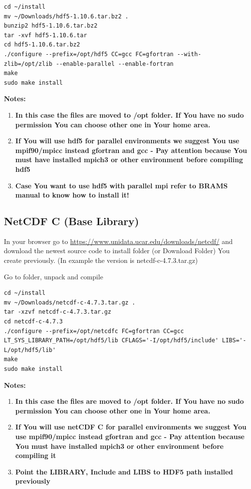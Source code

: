\documentclass{article}
\begin{document}
\begin{verbatim}
cd ~/install
mv ~/Downloads/hdf5-1.10.6.tar.bz2 .
bunzip2 hdf5-1.10.6.tar.bz2
tar -xvf hdf5-1.10.6.tar
cd hdf5-1.10.6.tar.bz2
./configure --prefix=/opt/hdf5 CC=gcc FC=gfortran --with-zlib=/opt/zlib --enable-parallel --enable-fortran
make
sudo make install
\end{verbatim}

\textbf{Notes:}
\begin{enumerate}
	\item \textbf{In this case the files are moved to /opt folder. If You have no sudo permission You can choose other one in Your home area.}
	\item \textbf{If You will use hdf5 for parallel environments we suggest You use mpif90/mpicc instead gfortran and gcc - Pay attention because You must have installed mpich3 or other environment before compiling hdf5}
	\item \textbf{Case You want to use hdf5 with parallel mpi refer to BRAMS manual to know how to install it!}
\end{enumerate}

\subsection{NetCDF C (Base Library)}

In your browser go to \href{https://www.unidata.ucar.edu/downloads/netcdf/}{https://www.unidata.ucar.edu/downloads/netcdf/} and download the newest source code 
   to install folder (or Download Folder) You create previously. (In example the version is netcdf-c-4.7.3.tar.gz)
   
Go to folder, unpack and compile

\begin{verbatim}
cd ~/install
mv ~/Downloads/netcdf-c-4.7.3.tar.gz .
tar -xzvf netcdf-c-4.7.3.tar.gz
cd netcdf-c-4.7.3
./configure --prefix=/opt/netcdfc FC=gfortran CC=gcc LT_SYS_LIBRARY_PATH=/opt/hdf5/lib CFLAGS='-I/opt/hdf5/include' LIBS='-L/opt/hdf5/lib'
make
sudo make install
\end{verbatim}

\textbf{Notes:}
\begin{enumerate}
	\item \textbf{In this case the files are moved to /opt folder. If You have no sudo permission You can choose other one in Your home area.}
	\item \textbf{If You will use netCDF C for parallel environments we suggest You use mpif90/mpicc instead gfortran and gcc - Pay attention because You must have installed mpich3 or other environment before compiling it}
	\item \textbf{Point the LIBRARY, Include and LIBS to HDF5 path installed previously }
\end{enumerate}
   
\end{document}
